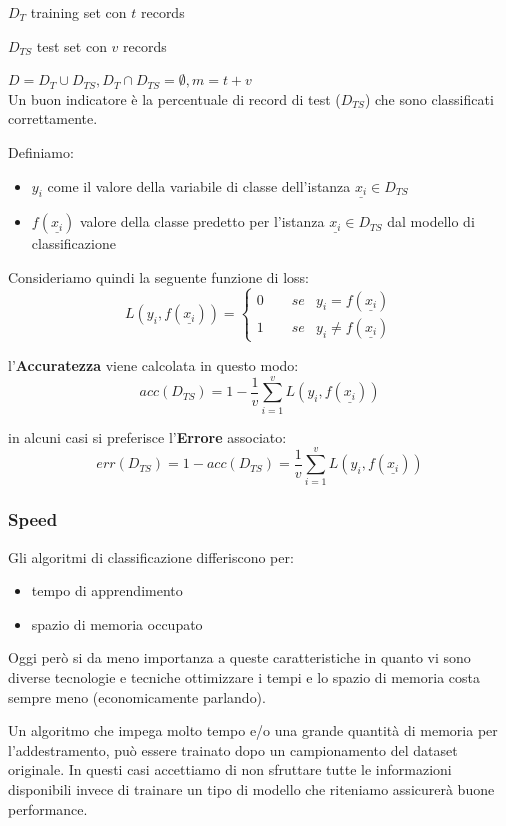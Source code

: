 $D_T$ training set con $t$ records

$D_{TS}$ test set con $v$ records

$D = D_T \cup D_{TS},D_T \cap D_{TS} = \emptyset,m = t + v$\\

Un buon indicatore è la percentuale di record di test ($D_{TS}$) che sono classificati correttamente. 

Definiamo:
\begin{itemize}
	\item $y_i$ come il valore della variabile di classe dell'istanza $\underline{x_i} \in D_{TS}$
	\item $f(\underline{x_i})$ valore della classe predetto per l'istanza $\underline{x_i} \in D_{TS}$ dal modello di classificazione
\end{itemize} 
Consideriamo quindi la seguente funzione di loss:
\[
L(y_i, f(\underline{x_i})) =  
\begin{cases}
	0 \qquad se &y_i = f(\underline{x_i}) \\
	1 \qquad se &y_i \ne f(\underline{x_i})
\end{cases}
\]

l'\textbf{Accuratezza} viene calcolata in questo modo:
\[ acc(D_{TS}) = 1 - \frac{1}{v} \sum_{i=1}^{v} L(y_i, f(\underline{x_i}))\]

in alcuni casi si preferisce l'\textbf{Errore} associato:
\[err(D_{TS}) = 1 - acc(D_{TS}) = \frac{1}{v} \sum_{i=1}^{v} L(y_i, f(\underline{x_i}))\]

\subsubsection{Speed}
Gli algoritmi di classificazione differiscono per:
\begin{itemize}
	\item tempo di apprendimento
	\item spazio di memoria occupato
\end{itemize}
Oggi però si da meno importanza a queste caratteristiche in quanto vi sono diverse tecnologie e tecniche ottimizzare i tempi e lo spazio di memoria costa sempre meno (economicamente parlando).

Un algoritmo che impega molto tempo e/o una grande quantità di memoria per l'addestramento, pu\`o essere trainato dopo un campionamento del dataset originale. In questi casi accettiamo di non sfruttare tutte le informazioni disponibili invece di trainare un tipo di modello che riteniamo assicurerà buone performance.

